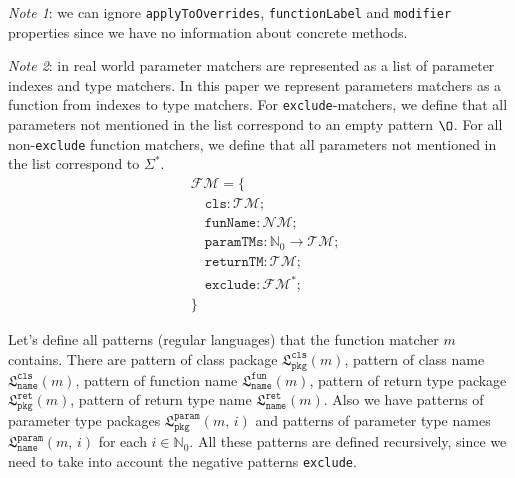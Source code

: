 \documentclass{article}
\newcommand{\lang}{\mathfrak{L}}
\begin{document}
\noindent \textit{Note 1}: we can ignore \texttt{applyToOverrides}, \texttt{functionLabel} and \texttt{modifier} properties since we have no information about concrete methods.

\noindent \textit{Note 2}: in real world parameter matchers are represented as a list of parameter indexes and type matchers. In this paper we represent parameters matchers as a function from indexes to type matchers. For \texttt{exclude}-matchers, we define that all parameters not mentioned in the list correspond to an empty pattern $\O$. For all non-\texttt{exclude} function matchers, we define that all parameters not mentioned in the list correspond to $\Sigma^*$.
\begin{align*}
& \mathcal{FM} = \{\; \\
& \quad \texttt{cls} : \mathcal{TM}; \\
& \quad \texttt{funName} : \mathcal{NM}; \\
& \quad \texttt{paramTMs} : \mathbb{N}_0 \rightarrow \mathcal{TM}; \\
& \quad \texttt{returnTM} : \mathcal{TM}; \\
& \quad \texttt{exclude} : \mathcal{FM}^*; \\
& \}
\end{align*}

Let's define all patterns (regular languages) that the function matcher $m$ contains.
There are pattern of class package $\lang_\texttt{pkg}^\texttt{cls}(m)$, pattern of class name $\lang_\texttt{name}^\texttt{cls}(m)$, pattern of function name $\lang_\texttt{name}^\texttt{fun}(m)$, pattern of return type package $\lang_\texttt{pkg}^\texttt{ret}(m)$, pattern of return type name $\lang_\texttt{name}^\texttt{ret}(m)$.
Also we have patterns of parameter type packages $\lang_\texttt{pkg}^\texttt{param}(m,\, i)$ and patterns of parameter type names $\lang_\texttt{name}^\texttt{param}(m,\, i)$ for each $i \in \mathbb{N}_0$. All these patterns are defined recursively, since we need to take into account the negative patterns \texttt{exclude}.
\end{document}
